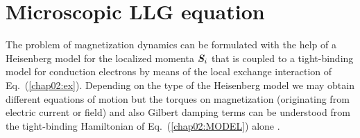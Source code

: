 \section{Microscopic LLG equation} 

The problem of magnetization dynamics can be formulated with the help of a Heisenberg model for the localized momenta $\boldsymbol{S}_i$ that is coupled to a tight-binding model for conduction electrons by means of the local exchange interaction of Eq.~(\ref{chap02:ex}). Depending on the type of the Heisenberg model we may obtain different equations of motion but the torques on magnetization (originating from electric current or field) and also Gilbert damping terms can be understood from the tight-binding Hamiltonian of Eq.~(\ref{chap02:MODEL}) alone \cite{ado_anisotropy_2019}. 




